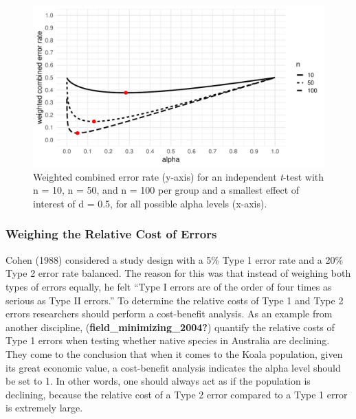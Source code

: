 \documentclass[
  english,
  ,jou,floatsintext]{apa6}
\begin{document}
\begin{figure}
\centering
\includegraphics{Justify_in_Practice_files/figure-latex/weight-plot-1.pdf}
\caption{\label{fig:weight-plot}Weighted combined error rate (y-axis) for an independent \emph{t}-test with n = 10, n = 50, and n = 100 per group and a smallest effect of interest of d = 0.5, for all possible alpha levels (x-axis).}
\end{figure}

\hypertarget{weighing-the-relative-cost-of-errors}{%
\subsubsection{Weighing the Relative Cost of Errors}\label{weighing-the-relative-cost-of-errors}}

Cohen (1988) considered a study design with a 5\% Type 1 error rate and a 20\% Type 2 error rate balanced. The reason for this was that instead of weighing both types of errors equally, he felt ``Type I errors are of the order of four times as serious as Type II errors.'' To determine the relative costs of Type 1 and Type 2 errors researchers should perform a cost-benefit analysis. As an example from another discipline, (\textbf{field\_minimizing\_2004?}) quantify the relative costs of Type 1 errors when testing whether native species in Australia are declining. They come to the conclusion that when it comes to the Koala population, given its great economic value, a cost-benefit analysis indicates the alpha level should be set to 1. In other words, one should always act as if the population is declining, because the relative cost of a Type 2 error compared to a Type 1 error is extremely large.
\end{document}
